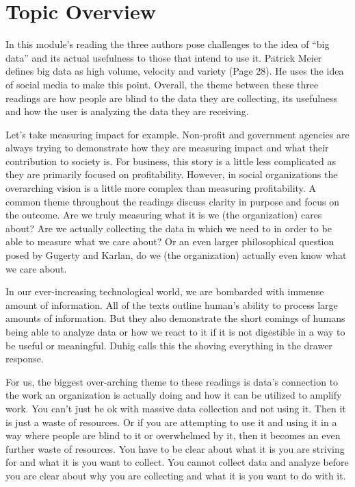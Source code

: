 \documentclass[]{book}
\theoremstyle{definition}
\theoremstyle{definition}
\theoremstyle{definition}
\theoremstyle{remark}
\begin{document}
\hypertarget{topic-overview-1}{%
\section{Topic Overview}\label{topic-overview-1}}

In this module's reading the three authors pose challenges to the idea
of ``big data'' and its actual usefulness to those that intend to use
it. Patrick Meier defines big data as high volume, velocity and variety
(Page 28). He uses the idea of social media to make this point. Overall,
the theme between these three readings are how people are blind to the
data they are collecting, its usefulness and how the user is analyzing
the data they are receiving.

Let's take measuring impact for example. Non-profit and government
agencies are always trying to demonstrate how they are measuring impact
and what their contribution to society is. For business, this story is a
little less complicated as they are primarily focused on profitability.
However, in social organizations the overarching vision is a little more
complex than measuring profitability. A common theme throughout the
readings discuss clarity in purpose and focus on the outcome. Are we
truly measuring what it is we (the organization) cares about? Are we
actually collecting the data in which we need to in order to be able to
measure what we care about? Or an even larger philosophical question
posed by Gugerty and Karlan, do we (the organization) actually even know
what we care about.

In our ever-increasing technological world, we are bombarded with
immense amount of information. All of the texts outline human's ability
to process large amounts of information. But they also demonstrate the
short comings of humans being able to analyze data or how we react to it
if it is not digestible in a way to be useful or meaningful. Duhig calls
this the shoving everything in the drawer response.

For us, the biggest over-arching theme to these readings is data's
connection to the work an organization is actually doing and how it can
be utilized to amplify work. You can't just be ok with massive data
collection and not using it. Then it is just a waste of resources. Or if
you are attempting to use it and using it in a way where people are
blind to it or overwhelmed by it, then it becomes an even further waste
of resources. You have to be clear about what it is you are striving for
and what it is you want to collect. You cannot collect data and analyze
before you are clear about why you are collecting and what it is you
want to do with it.
\end{document}
